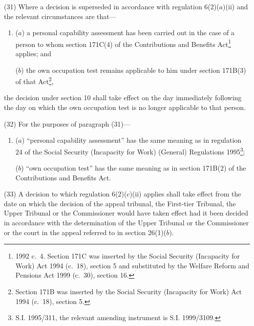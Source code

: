 \documentclass[12pt,a4paper]{article}
\begin{document}
\begin{sloppypar}
(31) Where a decision is superseded in accordance with regulation 6(2)($a$)(ii)  and the relevant circumstances are that—
\end{sloppypar}
\begin{enumerate}\item[]
($a$) a personal capability assessment has been carried out in the case of a person to whom section 171C(4) of the Contributions and Benefits Act\footnote{1992 c.\ 4. Section 171C was inserted by the Social Security (Incapacity for Work) Act 1994 (c.\ 18), section 5 and substituted by the Welfare Reform and Pensions Act 1999 (c.\ 30), section 16.} applies; and

($b$) the own occupation test remains applicable to him under section 171B(3) of that Act\footnote{Section 171B was inserted by the Social Security (Incapacity for Work) Act 1994 (c.\ 18), section 5.},
\end{enumerate}
the decision under section 10 shall take effect on the day immediately following the day on which the own occupation test is no longer applicable to that person.

(32) For the purposes of paragraph (31)—
\begin{enumerate}\item[]
($a$) “personal capability assessment” has the same meaning as in regulation 24 of the Social Security (Incapacity for Work) (General) Regulations 1995\footnote{S.I. 1995/311, the relevant amending instrument is S.I. 1999/3109.};

($b$) “own occupation test” has the same meaning as in section 171B(2) of the Contributions and Benefits Act.
\end{enumerate}

(33) A decision to which regulation 6(2)($c$)(ii)  applies shall take effect from the date on which 
the decision of the appeal tribunal, the First-tier Tribunal, the Upper Tribunal or the Commissioner  %
would have taken effect had it been decided in accordance with the determination of the 
Upper Tribunal  %
or the Commissioner  %
or the court in the appeal referred to in section 26(1)($b$).
\end{document}

